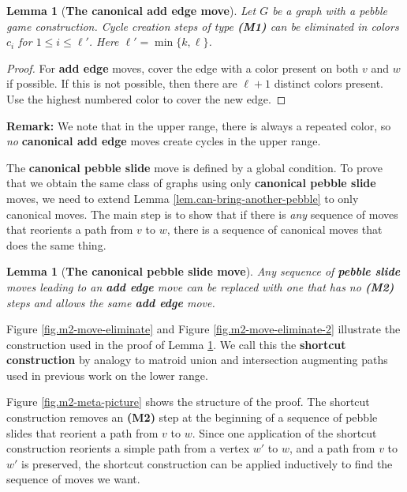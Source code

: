 \documentclass[11pt]{article}
\newcommand{\reffig}[1]{Figure \ref{fig.#1}}
\newtheorem{lemma}[theorem]{Lemma}
\newcommand{\reflem}[1]{Lemma \ref{lem.#1}}
\newcommand{\labellem}[1]{\label{lem.#1}}
\begin{document}
	\begin{lemma}[{\bf The canonical add edge move}]
		Let $G$ be a graph with a pebble game construction. 
		Cycle creation steps of type {\bf (M1)} can be eliminated in colors $c_{i}$ for $1\le i\le \ell'$. 
		Here $\ell'=\min\{k,\ell\}$. \labellem{can-kill-m1-moves} 
	\end{lemma}
	\begin{proof}
		For {\bf add edge} moves, cover the edge with a color present on both $v$ and $w$ 
		if possible. If this is not possible, then there are $\ell+1$ 
		distinct colors present. Use the highest numbered color to cover 
		the new edge. 
	\end{proof}
	
	{\bf Remark:} We note that in the upper range, there is always a repeated color, so 
	{\it no} {\bf canonical add edge} moves create cycles in the upper range.
	
	
	The {\bf canonical pebble slide} move is defined by a global condition.  To prove that
	we obtain the same class of graphs using only {\bf canonical pebble slide} moves, 
	we need to extend \reflem{can-bring-another-pebble} to only 
	canonical moves.  The main step is to show that if there is {\it any }
	sequence of moves that reorients a path from $v$ to $w$, there is 
	a sequence of canonical moves that does the same thing.
	
	\begin{lemma}[{\bf The canonical pebble slide move}]\labellem{kill-m2-moves-locally}
		Any sequence of {\bf pebble slide} moves leading to an {\bf add edge}
		move can be replaced with one that has no {\bf (M2)} steps and allows the
		same {\bf add edge} move. 
	\end{lemma}
	
	\reffig{m2-move-eliminate} and \reffig{m2-move-eliminate-2} illustrate the
	construction used in the proof of \reflem{kill-m2-moves-locally}.  We call this 
	the {\bf shortcut construction} by analogy to matroid union and intersection 
	augmenting paths used in previous work on the lower range.
	
	\reffig{m2-meta-picture} shows the structure of the proof.  The shortcut construction 
	removes an {\bf (M2)} step at the beginning of a sequence of pebble slides that 
	reorient a path from $v$ to $w$.  Since one application of the shortcut construction 
	reorients a simple path from a vertex $w'$ to $w$, and a path from $v$ to $w'$ is 
	preserved, the shortcut construction can be applied inductively to find the sequence of moves
	we want.
	
\end{document}
